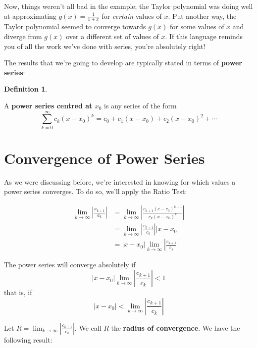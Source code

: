 \documentclass[
]{book}
\theoremstyle{definition}
\newtheorem{definition}{Definition}[chapter]
\theoremstyle{definition}
\theoremstyle{definition}
\theoremstyle{definition}
\theoremstyle{remark}
\begin{document}
Now, things weren't all bad in the example; the Taylor polynomial was doing well at approximating \(g(x)=\frac{1}{1+x}\) for \emph{certain} values of \(x\). Put another way, the Taylor polynomial seemed to converge towards \(g(x)\) for some values of \(x\) and diverge from \(g(x)\) over a different set of values of \(x\). If this language reminds you of all the work we've done with series, you're absolutely right!

The results that we're going to develop are typically stated in terms of \textbf{power series}:

\begin{definition}
\protect\hypertarget{def:unlabeled-div-237}{}\label{def:unlabeled-div-237}

A \textbf{power series centred at \(x_0\)} is any series of the form \[\sum_{k=0}^\infty c_k(x-x_0)^k=c_0+c_1(x-x_0)+c_2(x-x_0)^2+\cdots\]

\end{definition}

\hypertarget{convergence-of-power-series}{%
\section{Convergence of Power Series}\label{convergence-of-power-series}}

As we were discussing before, we're interested in knowing for which values a power series converges. To do so, we'll apply the Ratio Test:

\begin{align*}
\lim_{k\to\infty}\left | \frac{a_{k+1}}{a_k}\right | &= \lim_{k\to\infty}\left | \frac{c_{k+1}(c-c_0)^{k+1}}{c_k(x-x_0)^k}\right| \\
&= \lim_{k\to\infty}\left |\frac{c_{k+1}}{c_k} \right | |x-x_0|\\
&= |x-x_0| \lim_{k\to\infty}\left |\frac{c_{k+1}}{c_k} \right |
\end{align*}

The power series will converge absolutely if \[|x-x_0| \lim_{k\to\infty}\left |\frac{c_{k+1}}{c_k} \right |< 1\]
that is, if \[|x-x_0| < \lim_{k\to\infty}\left |\frac{c_{k+1}}{c_k} \right |\]

Let \(\displaystyle R=\lim_{k\to\infty}\left |\frac{c_{k+1}}{c_k} \right |\). We call \(R\) the \textbf{radius of convergence}. We have the following result:
\end{document}
